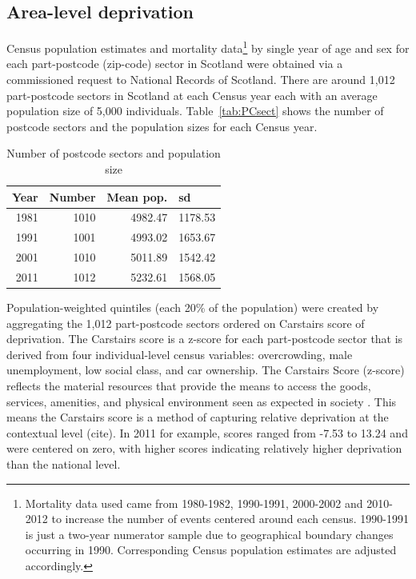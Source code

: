 \documentclass[12pt,oneside,a4paper]{article} %
\theoremstyle{definition}
\begin{document}
\subsection{Area-level deprivation}
Census population estimates and mortality data\footnote{Mortality data used
came from 1980-1982, 1990-1991, 2000-2002 and 2010-2012 to increase the
number of events centered around each census. 1990-1991 is just a two-year
numerator sample due to geographical boundary changes occurring in 1990.
Corresponding Census population estimates are adjusted accordingly.} by single
year of age and sex for each part-postcode (zip-code) sector in Scotland were
obtained via a commissioned request to National Records of Scotland. There are
around 1,012 part-postcode sectors in Scotland at each Census year each with an
average population size of 5,000 individuals. Table~\ref{tab:PCsect} shows the number of postcode sectors and the population sizes for each Census year.

\begin{table}[htbp]
  \centering
    \label{tab:PCsect}
  \caption{Number of postcode sectors and population size}
    \begin{tabular}{rrrr}
    \multicolumn{1}{l}{Year} & \multicolumn{1}{l}{Number} & \multicolumn{1}{l}{Mean pop.} & \multicolumn{1}{l}{sd} \\
    \midrule

    1981  & 1010  & 4982.47 & 1178.53 \\
    1991  & 1001  & 4993.02 & 1653.67 \\
    2001  & 1010  & 5011.89 & 1542.42 \\
    2011  & 1012  & 5232.61 & 1568.05 \\
    \bottomrule
    \end{tabular}%
  \label{tab:addlabel}%
\end{table}%


 
Population-weighted quintiles (each 20\% of the population) were created by
aggregating the 1,012 part-postcode sectors ordered on Carstairs score of
deprivation. The Carstairs score is a z-score for each part-postcode sector
that is derived from four individual-level census variables: overcrowding, male
unemployment, low social class, and car ownership. The Carstairs Score
(z-score) reflects the material resources that provide the means to access the
goods, services, amenities, and physical environment seen as expected
in society \citep{Carstairs1989}. This means the Carstairs score is a method of
capturing relative deprivation at the contextual level (cite). In 2011 for example, scores ranged from -7.53 to 13.24 and were centered on zero, with higher scores indicating relatively higher deprivation than the national level.
\end{document}
